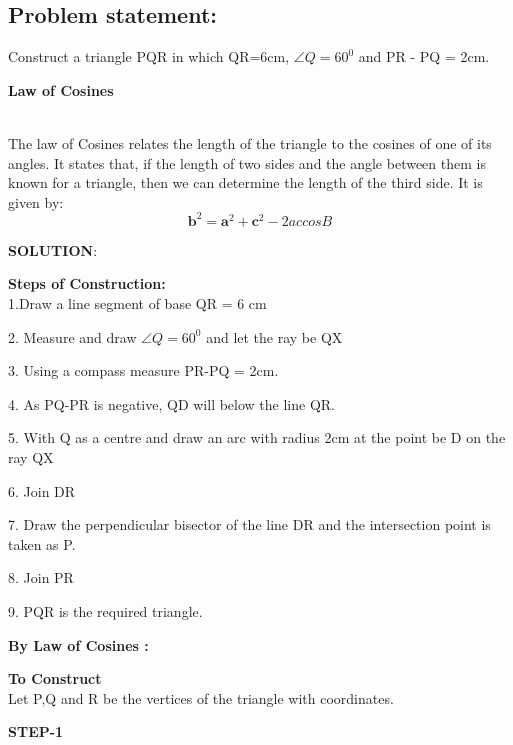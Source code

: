 \documentclass[10pt,a4paper]{article}
\let\vec\mathbf
\begin{document}
\begin{multicols}{2}
\section{Problem statement:}  Construct a triangle PQR in which QR=6cm, $\angle{Q}=60^0$ and PR - PQ = 2cm.\vspace{3mm}


\textbf{Law of Cosines}
\vspace{2mm}\raggedright \\

The law of Cosines relates the length of the triangle to the cosines of one of its angles. It states that, if the length of two sides and the angle between them is known for a triangle, then we can determine the length of the third side. It is given by:
\begin{equation}
\vec{b}^2=\vec{a}^2+\vec{c}^2-2accosB 
 \end{equation}

\raggedright \textbf{SOLUTION}:\vspace{2mm}\\
\raggedright \textbf{Steps of Construction:}\\

1.Draw a line segment of base QR = 6 cm

2. Measure and draw  $\angle{Q}=60^0$ and let the ray be QX

3. Using a compass measure PR-PQ = 2cm.

4. As PQ-PR is negative, QD will below the line QR.

5. With Q as a centre and draw an arc with radius 2cm at the point be D on the ray QX

6. Join DR

7. Draw the perpendicular bisector of the line DR and the intersection point is taken as P.

8. Join PR

9. PQR is the required triangle.

\vspace{5mm}
\textbf{By Law of Cosines :} \vspace{3mm}


\textbf{To Construct}\vspace{2mm}\\
Let P,Q and R be the vertices of the triangle  with coordinates.

\raggedright\textbf{STEP-1}\vspace{2mm}\\


\end{multicols}
\end{document}
